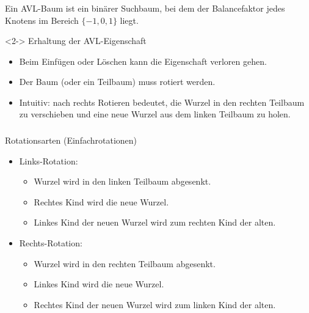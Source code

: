 \begin{frame}
\frametitle{\insertsection}
\begin{definition}
	Ein \alert{AVL-Baum} ist ein binärer Suchbaum, bei dem der Balancefaktor jedes Knotens im Bereich
	$\{-1,0,1\}$ liegt.
\end{definition}

\begin{block}<2->
{Erhaltung der AVL-Eigenschaft}
\begin{itemize}
	\item Beim Einfügen oder Löschen kann die Eigenschaft verloren gehen.
	\item Der Baum (oder ein Teilbaum) muss \alert{rotiert} werden.
	\item Intuitiv: \alert{nach rechts Rotieren} bedeutet, die Wurzel in den rechten Teilbaum zu verschieben
			und eine neue Wurzel aus dem linken Teilbaum zu holen.
\end{itemize}
\end{block}
\end{frame}

\begin{frame}
\frametitle{\insertsection}
\begin{block}
{Rotationsarten (\alert{Einfachrotationen})}
\begin{itemize}
	\item Links-Rotation:
	\begin{itemize}
		\item Wurzel wird in den linken Teilbaum abgesenkt.
		\item Rechtes Kind wird die neue Wurzel.
		\item Linkes Kind der neuen Wurzel wird zum rechten Kind der alten.
	\end{itemize}
	\item<2-> Rechts-Rotation:
	\begin{itemize}
		\item Wurzel wird in den rechten Teilbaum abgesenkt.
		\item Linkes Kind wird die neue Wurzel.
		\item Rechtes Kind der neuen Wurzel wird zum linken Kind der alten.
	\end{itemize}
\end{itemize}
\end{block}
\end{frame}

